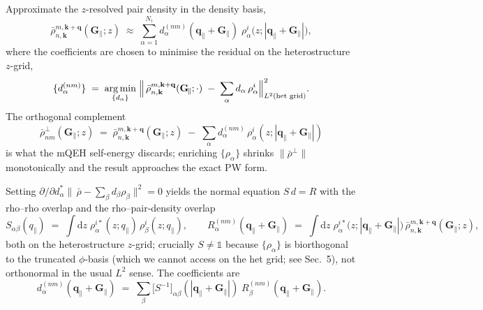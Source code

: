 \documentclass[11pt,a4paper]{article}
\newcommand{\qq}{\mathbf{q}}
\newcommand{\kk}{\mathbf{k}}
\newcommand{\Gpar}{\mathbf{G}_{\!\parallel}}
\newcommand{\qpar}{\mathbf{q}_{\parallel}}
\newcommand{\dd}{\mathrm{d}}
\begin{document}
Approximate the $z$-resolved pair density in the density basis,
\begin{equation}
\bar\rho^{m,\kk+\qq}_{n,\kk}(\Gpar;z)\;\approx\;
\sum_{\alpha=1}^{N_i} d^{(nm)}_{\alpha}(\qpar+\Gpar)\;
\rho^{i}_{\alpha}\!\bigl(z;|\qpar+\Gpar|\bigr),
\label{eq:rho-expansion}
\end{equation}
where the coefficients are chosen to minimise the residual on the
heterostructure $z$-grid,
\begin{equation}
\{d^{(nm)}_{\alpha}\}\;=\;
\underset{\{d_\alpha\}}{\arg\min}\;
\Bigl\|\,\bar\rho^{m,\kk+\qq}_{n,\kk}(\Gpar;\cdot)
\;-\;\sum_{\alpha} d_{\alpha}\,\rho^{i}_{\alpha}\Bigr\|^{2}_{L^{2}(\text{het grid})}.
\label{eq:LS-variational}
\end{equation}
The orthogonal complement
\begin{equation}
\bar\rho^{\perp}_{nm}(\Gpar;z)\;=\;
\bar\rho^{m,\kk+\qq}_{n,\kk}(\Gpar;z)\;-\;
\sum_{\alpha} d^{(nm)}_{\alpha}\,\rho^{i}_{\alpha}(z;|\qpar+\Gpar|)
\label{eq:rho-perp}
\end{equation}
is what the mQEH self-energy discards; enriching $\{\rho_\alpha\}$
shrinks $\|\bar\rho^{\perp}\|$ monotonically and the result
approaches the exact PW form.

Setting $\partial/\partial d^*_\alpha\|\,\bar\rho-\sum_\beta d_\beta
\rho_\beta\|^{2}=0$ yields the normal equation
$S\,d=R$ with the rho--rho overlap and the rho--pair-density overlap
\begin{equation}
S_{\alpha\beta}(q_\parallel)\;=\;
\int\!\dd z\;\rho^{i*}_{\alpha}(z;q_\parallel)\,
\rho^{i}_{\beta}(z;q_\parallel),\qquad
R^{(nm)}_{\alpha}(\qpar+\Gpar)\;=\;
\int\!\dd z\;\rho^{i*}_{\alpha}\!\bigl(z;|\qpar+\Gpar|\bigr)\,
\bar\rho^{m,\kk+\qq}_{n,\kk}(\Gpar;z),
\label{eq:S-and-R}
\end{equation}
both on the heterostructure $z$-grid; crucially $S\neq\mathbb{1}$
because $\{\rho_\alpha\}$ is biorthogonal to the truncated
$\phi$-basis (which we cannot access on the het grid; see Sec.~5),
not orthonormal in the usual $L^{2}$ sense.  The coefficients are
\begin{equation}
\boxed{\;
d^{(nm)}_{\alpha}(\qpar+\Gpar)\;=\;
\sum_{\beta}\bigl[S^{-1}\bigr]_{\alpha\beta}(|\qpar+\Gpar|)\;
R^{(nm)}_{\beta}(\qpar+\Gpar).
\;}
\label{eq:d-def}
\end{equation}
\end{document}
